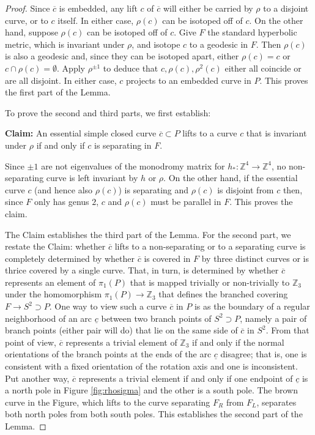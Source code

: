\documentclass{amsart}
\begin{document}
 \begin{proof}  Since $\overline{c}$ is embedded, any lift $c$ of $\overline{c}$ will either be carried by $\rho$ to a disjoint curve, or to $c$ itself.  In either case, $\rho(c)$ can be isotoped off of $c$.  On the other hand, suppose $\rho(c)$ can be isotoped off of $c$.  Give $F$ the standard hyperbolic metric, which is invariant under $\rho$, and isotope $c$ to a geodesic in $F$.  Then $\rho(c)$ is also a geodesic and, since they can be isotoped apart, either $\rho(c) = c$ or $c \cap \rho(c) = \emptyset$.  Apply $\rho^{\pm 1}$ to deduce that  $c, \rho(c), \rho^{2}(c)$ either all coincide or are all disjoint.  In either case, $c$ projects to an embedded curve in $P$.  This proves the first part of the Lemma.

To prove the second and third parts, we first establish:

\bigskip

{\bf Claim:}  An essential simple closed curve $\overline{c} \subset P$ lifts to a curve $c$ that is invariant under $\rho$ if and only if $c$ is separating in $F$.

\bigskip

  Since $\pm 1$ are not eigenvalues of the monodromy matrix for $h_*: \mathbb{Z}^4 \to \mathbb{Z}^4$, no non-separating curve is left invariant by $h$ or $\rho$.  On the other hand, if the essential curve $c$ (and hence also $\rho(c)$) is separating and $\rho(c)$ is disjoint from $c$ then, since $F$ only has genus $2$, $c$ and $\rho(c)$ must be parallel in $F$.  This proves the claim.

\bigskip

The Claim establishes the third part of the Lemma.  For the second part, we restate the Claim: whether $\overline{c}$ lifts to a non-separating or to a separating curve is completely determined by whether $\overline{c}$ is covered in $F$ by three distinct curves or is thrice covered by a single curve.  That, in turn, is determined by whether $\overline{c}$ represents an element of $\pi_1(P)$ that is mapped trivially or non-trivially to $\mathbb{Z}_3$ under the homomorphism $\pi_1(P) \to \mathbb{Z}_3$ that defines the branched covering $F \to S^2 \supset P$.  One way to view such a curve $\overline{c}$ in $P$ is as the boundary of a regular neighborhood of an arc $\underline{c}$ between two branch points of $S^2 \supset P$, namely a pair of branch points (either pair will do) that lie on the same side of $\overline{c}$ in $S^2$.  From that point of view, $\overline{c}$ represents a trivial element of $\mathbb{Z}_3$ if and only if the normal orientations of the branch points at the ends of the arc $\underline{c}$ disagree; that is, one is consistent with a fixed orientation of the rotation axis and one is inconsistent.  Put another way, $\overline{c}$ represents a trivial element if and only if one endpoint of $\underline{c}$ is a north pole in Figure \ref{fig:rhosigma} and the other is a south pole.  The brown curve in the Figure, which lifts to the curve separating $F_R$ from $F_L$, separates both north poles from both south poles.  This establishes the second part of the Lemma.  \end{proof}
\end{document}
